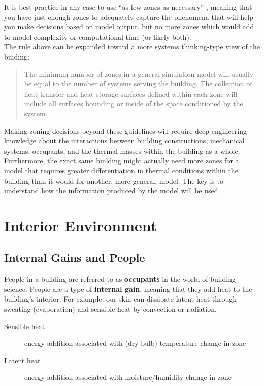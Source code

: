 \documentclass[10pt]{article}
\begin{document}
It is best practice in any case to use ``as few zones as necessary'' \cite{EPcourseteaching}, meaning that you have just enough zones to adequately capture the phenomena that will help you make decisions based on model output, but no more zones which would add to model complexity or computational time (or likely both).\\

The rule above can be expanded toward a more systems thinking-type view of the buiding:

\begin{quote}
    The minimum number of zones in a general simulation model will
usually be equal to the number of systems serving the building. The collection of heat transfer and
heat storage surfaces defined within each zone will include all surfaces bounding or inside of the
space conditioned by the system.
\end{quote}

Making zoning decisions beyond these guidelines will require deep engineering knowledge about the interactions between building constructions, mechanical systems, occupants, and the thermal masses within the building as a whole. Furthermore, the exact same building might actually need more zones for a model that requires greater differentiation in thermal conditions within the building than it would for another, more general, model. The key is to understand how the information produced by the model will be used.

\section{Interior Environment}

\subsection{Internal Gains and People}

People in a building are referred to as \textbf{occupants} in the world of building science. People are a type of \textbf{internal gain}, meaning that they add heat to the building's interior. For example, our skin can dissipate latent heat through sweating (evaporation) and sensible heat by convection or radiation.

\begin{description}
\item[Sensible heat] energy addition associated with (dry-bulb) temperature change in zone \cite{EPcourseteaching}
\item[Latent heat] energy addition associated with moisture/humidity change in zone \cite{EPcourseteaching} 
\end{description}
\end{document}
